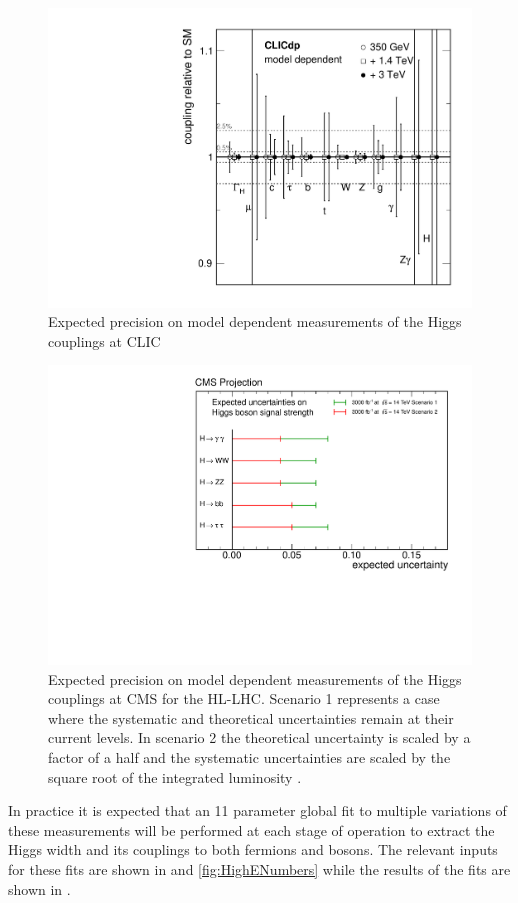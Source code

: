 \begin{figure}
\centering
\includegraphics[width=0.65\linewidth]{Theory/fig/FitResultsMD.pdf}
\caption[Expected precision on model dependent measurements of the Higgs couplings at CLIC]{Expected precision on model dependent measurements of the Higgs couplings at CLIC \cite{Abramowicz:2016zbo}}
\label{fig:modelDependentCouplings}
\end{figure}

\begin{figure}
\centering
\includegraphics[width=0.7\linewidth]{Theory/fig/MuSnowmass3000.pdf}
\caption[Expected precision on model dependent measurements of the Higgs couplings at CMS]{Expected precision on model dependent measurements of the Higgs couplings at \ac{CMS} for the \ac{HL-LHC}. Scenario 1 represents a case where the systematic and theoretical uncertainties remain at their current levels. In scenario 2 the theoretical uncertainty is scaled by a factor of a half and the systematic uncertainties are scaled by the square root of the integrated luminosity \cite{CMS:2013xfa}.}
\label{fig:CMSHiggsPredictions}
\end{figure}

In practice it is expected that an 11 parameter global fit to multiple variations of these measurements will be performed at each stage of operation to extract the Higgs width and its couplings to both fermions and bosons. The relevant inputs for these fits are shown in  and \ref{fig:HighENumbers} while the results of the fits are shown in .

